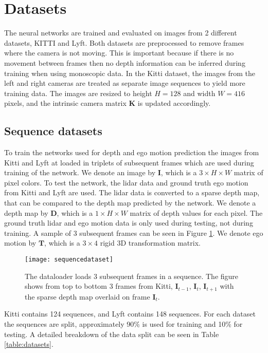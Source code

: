 \section{Datasets}

The neural networks are trained and evaluated on images from 2 different datasets, KITTI\cite{kitti} and Lyft\cite{lyft2019}. Both datasets are preprocessed to remove frames where the camera is not moving. This is important because if there is no movement between frames then no depth information can be inferred during training when using monoscopic data. In the Kitti dataset, the images from the left and right cameras are treated as separate image sequences to yield more training data. The images are resized to height $H=128$ and width $W=416$ pixels, and the intrinsic camera matrix $\textbf{K}$ is updated accordingly.

\subsection{Sequence datasets}

To train the networks used for depth and ego motion prediction the images from Kitti and Lyft at loaded in triplets of subsequent frames which are used during training of the network. We denote an image by $\textbf{I}$, which is a $3\times H\times W$ matrix of \abbrRGB pixel colors. To test the network, the lidar data and ground truth ego motion from Kitti and Lyft are used. The lidar data is converted to a sparse depth map, that can be compared to the depth map predicted by the network. We denote a depth map by $\textbf{D}$, which is a $1\times H \times W$ matrix of depth values for each pixel. The ground truth lidar and ego motion data is only used during testing, not during training. A sample of 3 subsequent frames can be seen in Figure \ref{fig:sequencedataset}. We denote ego motion by $\textbf{T}$, which is a $3\times 4$ rigid 3D transformation matrix.

\begin{figure}[H]
	\centering
	\texttt{[image: sequencedataset]}
	\caption{The dataloader loads 3 subsequent frames in a sequence. The figure shows from top to bottom 3 frames from Kitti, $\textbf{I}_{t-1}$, $\textbf{I}_t$, $\textbf{I}_{t+1}$ with the sparse depth map overlaid on frame $\textbf{I}_t$.}
	\label{fig:sequencedataset}
\end{figure}

Kitti contains 124 sequences, and Lyft contains 148 sequences. For each dataset the sequences are split, approximately 90\% is used for training and 10\% for testing. A detailed breakdown of the data split can be seen in Table \ref{table:datasets}.

